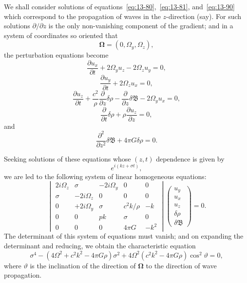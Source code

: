 We shall consider solutions of equations~\eqref{eq:13-80},~\eqref{eq:13-81}, and~\eqref{eq:13-90} which correspond to the propagation of waves in the $z$-direction (say). For such solutions $\partial/\partial z$ is the only non-vanishing component of the gradient; and in a system of coordinates so oriented that
\begin{equation}
\label{eq:13-91}
\boldsymbol{\Omega} = (0, \Omega_y, \Omega_z),
\end{equation}
the perturbation equations become
\begin{equation}
\label{eq:13-92}
\frac{\partial u_x}{\partial t} + 2\Omega_y u_z - 2\Omega_z u_y = 0,
\end{equation}
\begin{equation}
\label{eq:13-93}
\frac{\partial u_y}{\partial t} + 2\Omega_z u_x = 0,
\end{equation}
\begin{equation}
\label{eq:13-94}
\frac{\partial u_z}{\partial t} + \frac{c^2}{\rho}\frac{\partial}{\partial z}\delta\rho - \frac{\partial}{\partial z}\delta\mathfrak{B} - 2\Omega_y u_x = 0,
\end{equation}
\begin{equation}
\label{eq:13-95}
\frac{\partial}{\partial t}\delta\rho + \rho\frac{\partial u_z}{\partial z} = 0,
\end{equation}
and
\begin{equation}
\label{eq:13-96}
\frac{\partial^2}{\partial z^2}\delta\mathfrak{B} + 4\pi G\delta\rho = 0.
\end{equation}

Seeking solutions of these equations whose $(z,t)$ dependence is given by
\begin{equation}
\label{eq:13-97}
e^{i(kz+\sigma t)},
\end{equation}
we are led to the following system of linear homogeneous equations:
\begin{equation}
\label{eq:13-98}
\begin{vmatrix}
2i\Omega_z & \sigma & -2i\Omega_y & 0 & 0 \\
\sigma & -2i\Omega_z & 0 & 0 & 0 \\
0 & +2i\Omega_y & \sigma & c^2k/\rho & -k \\
0 & 0 & pk & \sigma & 0 \\
0 & 0 & 0 & 4\pi G & -k^2
\end{vmatrix}
\begin{pmatrix}
u_y \\ u_x \\ u_z \\ \delta\rho \\ \delta\mathfrak{B}
\end{pmatrix} = 0.
\end{equation}
The determinant of this system of equations must vanish; and on expanding the determinant and reducing, we obtain the characteristic equation
\begin{equation}
\label{eq:13-99}
\sigma^4 - (4\Omega^2+c^2k^2-4\pi G\rho)\sigma^2 + 4\Omega^2(c^2k^2-4\pi G\rho)\cos^2\!\vartheta = 0,
\end{equation}
where $\vartheta$ is the inclination of the direction of $\boldsymbol{\Omega}$ to the direction of wave propagation.

